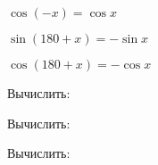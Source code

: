 \begin{listofex}
{{\begin{minipage}[t]{0,3\textwidth}
				\( \cos(-x) = \cos x \)
			\end{minipage}
			\begin{minipage}[t]{0,3\textwidth}
				
				\( \sin(180+x) = -\sin x \)
				
				\( \cos(180+x) = -\cos x \)
			\end{minipage}
		}
	}
	\item Вычислить:
	\begin{enumcols}[itemcolumns=1]
		\item {}
		\item {}
		\item {}
	\end{enumcols}
	\item Вычислить:
	\begin{enumcols}[itemcolumns=2]
		\item {}
		\item {}
		\item {}
		\item {}
	\end{enumcols}
	\item Вычислить:
	\begin{enumcols}[itemcolumns=2]
		\item {}
		\item {}
		\item {}
	\end{enumcols}
	\item {}
\end{listofex}